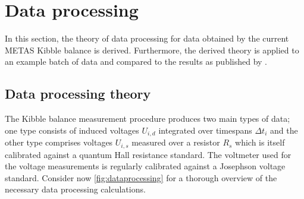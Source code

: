 \documentclass{report}
\numberwithin{tm}{section}
\begin{document}
\section{Data processing}
In this section, the theory of data processing for data obtained by the current METAS Kibble balance is derived. Furthermore, the derived theory is applied to an example batch of data and compared to the results as published by \cite{Eichenberger_2022}.

\subsection{Data processing theory}\label{sec:dataprocessingtheory_v1}
The Kibble balance measurement procedure produces two main types of data; one type consists of induced voltages $U_{i,d}$ integrated over timespans $\Delta t_i$ and the other type comprises voltages $U_{i,s}$ measured over a resistor $R_s$ which is itself calibrated against a quantum Hall resistance standard. The voltmeter used for the voltage measurements is regularly calibrated against a Josephson voltage standard. Consider now \cref{fig:dataprocessing} for a thorough overview of the necessary data processing calculations.
\end{document}
